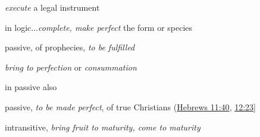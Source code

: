 \begin{compactdesc}
\begin{compactitem}
							\item[I.1.b] \textit{execute} a legal instrument
							\item[I.2] in logic...\textit{complete, make perfect} the form or species
							\item[I.3] passive, of prophecies, \textit{to be fulfilled}
							\item[II.1] \textit{bring to perfection} or \textit{consummation}
							\item[II.2] in passive also
							\item[II.3] passive, \textit{to be made perfect}, of true Christians (\hyperref[HEBREWS-11-40]{Hebrews 11:40}, \hyperref[HEBREWS-12-23]{12:23}]
							\item[III] intransitive, \textit{bring fruit to maturity, come to maturity}
						\end{compactitem}
				\end{compactdesc}
				
				
				
			\subparagraph{\texorpdfstring{}{}}
				\label{TELEIOSIS}
			
